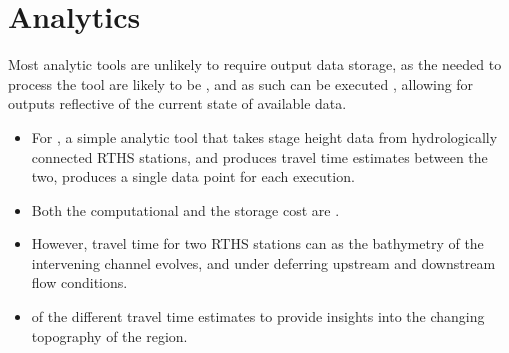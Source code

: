\documentclass[letterpaper,12pt,english]{sphinxmanual}
\begin{document}
\section{Analytics}
\label{\detokenize{requirements/information/analytics:analytics}}\label{\detokenize{requirements/information/analytics::doc}}
\sphinxAtStartPar
Most analytic tools are unlikely to require output data storage, as the  needed to process the tool are likely to be , and as such can be executed , allowing for outputs reflective of the current state of available data.
\begin{itemize}
\item {} 
\sphinxAtStartPar
For , a simple analytic tool that takes stage height data from hydrologically connected RTHS stations, and produces travel time estimates between the two, produces a single data point for each execution.

\item {} 
\sphinxAtStartPar
Both the computational  and the storage cost are .

\item {} 
\sphinxAtStartPar
However, travel time  for two RTHS stations can  as the bathymetry of the intervening channel evolves, and under deferring upstream and downstream flow conditions.

\item {} 
\sphinxAtStartPar
{} of the different travel time estimates  to provide insights into the changing topography of the region.

\end{itemize}
\end{document}
